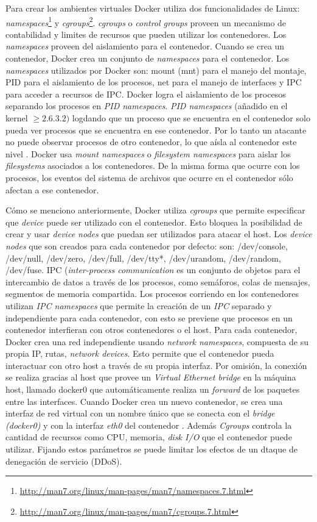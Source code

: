 Para crear los ambientes virtuales Docker utiliza dos funcionalidades de Linux: \emph{namespaces}\footnote{\url{http://man7.org/linux/man-pages/man7/namespaces.7.html}} y \emph{cgroups}\footnote{\url{http://man7.org/linux/man-pages/man7/cgroups.7.html}}. \emph{cgroups} o \emph{control groups} proveen un mecanismo de contabilidad y limites de recursos que pueden utilizar los contenedores\cite{bui2015analysis}. Los \emph{namespaces} proveen del aislamiento para el contenedor. 
Cuando se crea un contenedor, Docker crea un conjunto de \emph{namespaces} para el contenedor. Los \emph{namespaces} utilizados por Docker son: mount (mnt) para el manejo del montaje, PID para el aislamiento de los procesos, net para el manejo de interfaces y IPC para acceder a recursos de IPC. 
Docker logra el aislamiento de los procesos separando los procesos en \emph{PID namespaces}.
\emph{PID namespaces} (añadido en el kernel \( \geq 2.6.3.2)\) logdando que un proceso que se encuentra en el contenedor solo pueda ver procesos que se encuentra en ese contenedor. Por lo tanto un atacante no puede observar procesos de otro contenedor, lo que aísla al contenedor este nivel \cite{bui2015analysis}.
Docker usa \emph{mount namespaces} o \emph{filesystem namespaces} para aislar los \emph{filesystems} asociados a los contenedores. De la misma forma que ocurre con los procesos, los eventos del sistema de archivos que ocurre en el contenedor sólo afectan a ese contenedor.

Cómo se menciono anteriormente, Docker utiliza \emph{cgroups} que permite especificar que \emph{device} puede ser utilizado con el contenedor. Esto bloquea la posibilidad de crear y usar \emph{device nodes} que puedan ser utilizados para atacar el host. Los \emph{device nodes} que son creados para cada contenedor por defecto: son: /dev/console, /dev/null, /dev/zero, /dev/full, /dev/tty*, /dev/urandom, /dev/random, /dev/fuse.
IPC (\emph{inter-process communication} es un conjunto de objetos para el intercambio de datos a través de los procesos, como semáforos, colas de mensajes, segmentos de memoria compartida. Los procesos corriendo en los contenedores utilizan \emph{IPC namespaces} que permite la creación de un \emph{IPC} separado y independiente para cada contenedor, con esto se previene que procesos en un contenedor interfieran con otros contenedores o el host.
Para cada contenedor, Docker crea una red independiente usando \emph{network namespaces}, compuesta de su propia IP, rutas, \emph{network devices}. Esto permite que el contenedor pueda interactuar con otro host a través de su propia interfaz.
Por omisión, la conexión se realiza gracias al host que provee un \emph{Virtual Ethernet bridge} en la máquina host, llamado docker0 que automáticamente realiza un \emph{forward} de los paquetes entre las interfaces. Cuando Docker crea un nuevo contenedor, se crea una interfaz de red virtual con un nombre único que se conecta con el \emph{bridge (docker0)} y con la interfaz \emph{eth0} del contenedor \cite{bui2015analysis}.
Además \emph{Cgroups} controla la cantidad de recursos como CPU, memoria, \emph{disk I/O} que el contenedor puede utilizar. 
Fijando estos parámetros se puede limitar los efectos de un dtaque de denegación de servicio (DDoS).

